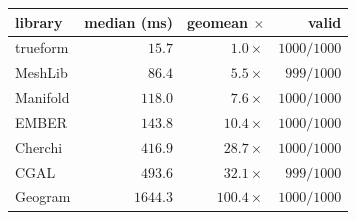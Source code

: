 \begin{tabular*}{\columnwidth}{@{\extracolsep{\fill}}lrrr@{}}
\toprule
library & median (ms) & geomean $\times$ & valid \\
\midrule
trueform & $15.7$   & $1.0\times$   & $1000/1000$ \\
MeshLib  & $86.4$   & $5.5\times$   & $999/1000$  \\
Manifold & $118.0$  & $7.6\times$   & $1000/1000$ \\
EMBER    & $143.8$  & $10.4\times$  & $1000/1000$ \\
Cherchi  & $416.9$  & $28.7\times$  & $1000/1000$ \\
CGAL     & $493.6$  & $32.1\times$  & $999/1000$  \\
Geogram  & $1644.3$ & $100.4\times$ & $1000/1000$ \\
\bottomrule
\end{tabular*}
